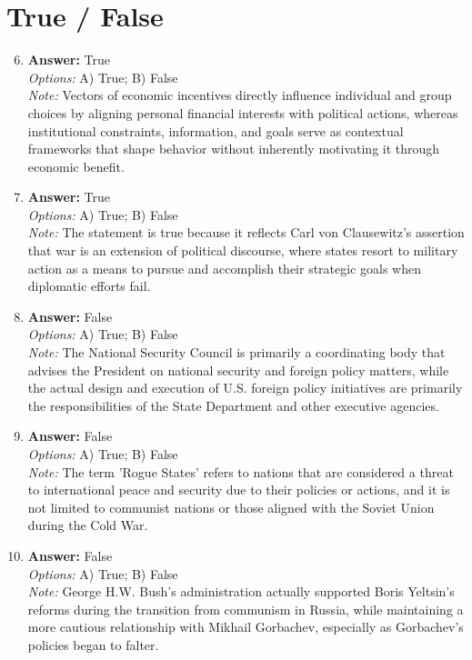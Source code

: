 \documentclass[12pt]{article}
\begin{document}
\section*{True / False}
\begin{enumerate}[label=\arabic*.]
\setcounter{enumi}{5}
\item \textbf{Answer:} True
\\ \textit{Options:} A) True; B) False
\\ \textit{Note:} Vectors of economic incentives directly influence individual and group choices by aligning personal financial interests with political actions, whereas institutional constraints, information, and goals serve as contextual frameworks that shape behavior without inherently motivating it through economic benefit.
\item \textbf{Answer:} True
\\ \textit{Options:} A) True; B) False
\\ \textit{Note:} The statement is true because it reflects Carl von Clausewitz's assertion that war is an extension of political discourse, where states resort to military action as a means to pursue and accomplish their strategic goals when diplomatic efforts fail.
\item \textbf{Answer:} False
\\ \textit{Options:} A) True; B) False
\\ \textit{Note:} The National Security Council is primarily a coordinating body that advises the President on national security and foreign policy matters, while the actual design and execution of U.S. foreign policy initiatives are primarily the responsibilities of the State Department and other executive agencies.
\item \textbf{Answer:} False
\\ \textit{Options:} A) True; B) False
\\ \textit{Note:} The term 'Rogue States' refers to nations that are considered a threat to international peace and security due to their policies or actions, and it is not limited to communist nations or those aligned with the Soviet Union during the Cold War.
\item \textbf{Answer:} False
\\ \textit{Options:} A) True; B) False
\\ \textit{Note:} George H.W. Bush's administration actually supported Boris Yeltsin's reforms during the transition from communism in Russia, while maintaining a more cautious relationship with Mikhail Gorbachev, especially as Gorbachev's policies began to falter.
\end{enumerate}
\end{document}
